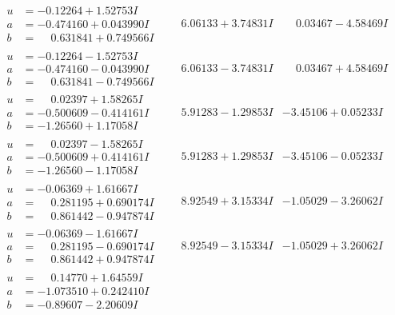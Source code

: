 \documentclass[1p]{elsarticle_modified}
\theoremstyle{definition}
\begin{document}
$$\begin{array}{c|c|c}
\begin{aligned}
u &= -0.12264 + 1.52753 I \\
a &= -0.474160 + 0.043990 I \\
b &= \phantom{-}0.631841 + 0.749566 I\end{aligned}
 & \phantom{-}6.06133 + 3.74831 I & \phantom{-}0.03467 - 4.58469 I \\ \hline\begin{aligned}
u &= -0.12264 - 1.52753 I \\
a &= -0.474160 - 0.043990 I \\
b &= \phantom{-}0.631841 - 0.749566 I\end{aligned}
 & \phantom{-}6.06133 - 3.74831 I & \phantom{-}0.03467 + 4.58469 I \\ \hline\begin{aligned}
u &= \phantom{-}0.02397 + 1.58265 I \\
a &= -0.500609 - 0.414161 I \\
b &= -1.26560 + 1.17058 I\end{aligned}
 & \phantom{-}5.91283 - 1.29853 I & -3.45106 + 0.05233 I \\ \hline\begin{aligned}
u &= \phantom{-}0.02397 - 1.58265 I \\
a &= -0.500609 + 0.414161 I \\
b &= -1.26560 - 1.17058 I\end{aligned}
 & \phantom{-}5.91283 + 1.29853 I & -3.45106 - 0.05233 I \\ \hline\begin{aligned}
u &= -0.06369 + 1.61667 I \\
a &= \phantom{-}0.281195 + 0.690174 I \\
b &= \phantom{-}0.861442 - 0.947874 I\end{aligned}
 & \phantom{-}8.92549 + 3.15334 I & -1.05029 - 3.26062 I \\ \hline\begin{aligned}
u &= -0.06369 - 1.61667 I \\
a &= \phantom{-}0.281195 - 0.690174 I \\
b &= \phantom{-}0.861442 + 0.947874 I\end{aligned}
 & \phantom{-}8.92549 - 3.15334 I & -1.05029 + 3.26062 I \\ \hline\begin{aligned}
u &= \phantom{-}0.14770 + 1.64559 I \\
a &= -1.073510 + 0.242410 I \\
b &= -0.89607 - 2.20609 I\end{aligned}

\end{array}$$
\end{document}
